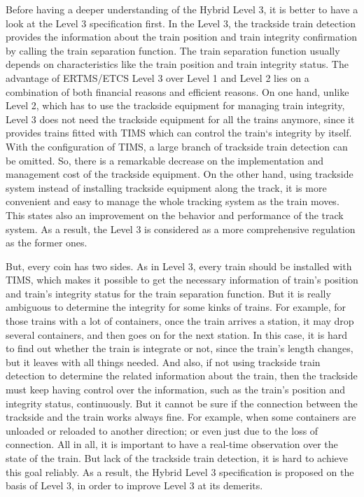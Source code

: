 \documentclass[article,dr=phil,type=msc,colorback,accentcolor=tud9c]{tudthesis}
\begin{document}
  Before having a deeper understanding of the Hybrid Level 3, it is better to have a look at the Level 3 specification first. In the Level 3, the trackside train detection provides the information about the train position and train integrity confirmation by calling the train separation function. The train separation function usually depends on characteristics like the train position and train integrity status. \cite{hybridl3} The advantage of ERTMS/ETCS Level 3 over Level 1 and Level 2 lies on a combination of both financial reasons and efficient reasons. On one hand, unlike Level 2, which has to use the trackside equipment for managing train integrity, Level 3 does not need the trackside equipment for all the trains anymore, since it provides trains fitted with TIMS which can control the train‘s integrity by itself. With the configuration of TIMS, a large branch of trackside train detection can be omitted. So, there is a remarkable decrease on the implementation and management cost of the trackside equipment. On the other hand, using trackside system instead of installing trackside equipment along the track, it is more convenient and easy to manage the whole tracking system as the train moves. This states also an improvement on the behavior and performance of the track system. As a result, the Level 3 is considered as a more comprehensive regulation as the former ones.\cite{eceuropaeu}
  
  But, every coin has two sides. As in Level 3, every train should be installed with TIMS, which makes it possible to get the necessary information of train's position and train's integrity status for the train separation function. But it is really ambiguous to determine the integrity for some kinks of trains. For example, for those trains with a lot of containers, once the train arrives a station, it may drop several containers, and then goes on for the next station. In this case, it is hard to find out whether the train is integrate or not, since the train's length changes, but it leaves with all things needed. And also, if not using trackside train detection to determine the related information about the train, then the trackside must keep having control over the information, such as the train's position and integrity status, continuously. But it cannot be sure if the connection between the trackside and the train works always fine. For example, when some containers are unloaded or reloaded to another direction; or even just due to the loss of connection. All in all, it is important to have a real-time observation over the state of the train. But lack of the trackside train detection, it is hard to achieve this goal reliably. As a result, the Hybrid Level 3 specification is proposed on the basis of Level 3, in order to improve Level 3 at its demerits.
  
\end{document}
